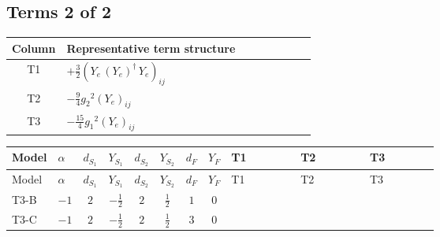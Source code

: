 \documentclass[8pt]{article}
\begin{document}
\begin{landscape}
\subsection*{Terms 2 of 2}
\begin{center}
\begin{tabular}{@{}c >{\raggedright\arraybackslash}p{0.82\linewidth}@{}}
\toprule
Column & Representative term structure \\
\midrule
T1 & \(\displaystyle +\frac{3}{2} \left({Y_e}\,\left({Y_e}\right)^{\dagger}\,{Y_e}\right)_{ij}\) \\
\midrule
T2 & \(\displaystyle -\frac{9}{4} {g_2}^2 \left({Y_e}\right)_{ij}\) \\
\midrule
T3 & \(\displaystyle -\frac{15}{4} {g_1}^2 \left({Y_e}\right)_{ij}\) \\
\midrule
\bottomrule
\end{tabular}
\end{center}
\smallskip
\tiny
\begin{longtable}{@{}llcccccc >{\raggedright\arraybackslash}p{0.21\linewidth} >{\raggedright\arraybackslash}p{0.21\linewidth} >{\raggedright\arraybackslash}p{0.21\linewidth}@{}}
\toprule
Model & $\alpha$ & $d_{S_1}$ & $Y_{S_1}$ & $d_{S_2}$ & $Y_{S_2}$ & $d_F$ & $Y_F$ & T1 & T2 & T3 \\
\midrule
\endfirsthead
\toprule
Model & $\alpha$ & $d_{S_1}$ & $Y_{S_1}$ & $d_{S_2}$ & $Y_{S_2}$ & $d_F$ & $Y_F$ & T1 & T2 & T3 \\
\midrule
\endhead
T3-B & $-1$ & $2$ & $-\frac{1}{2}$ & $2$ & $\frac{1}{2}$ & $1$ & $0$ & \scriptsize\adjustbox{max width=\linewidth}{$\begin{gathered} +\frac{3}{2} \left({Y_e}\,\left({Y_e}\right)^{\dagger}\,{Y_e}\right)_{ij}\end{gathered}$} & \scriptsize\adjustbox{max width=\linewidth}{$\begin{gathered} -\frac{9}{4} {g_2}^2 \left({Y_e}\right)_{ij}\end{gathered}$} & \scriptsize\adjustbox{max width=\linewidth}{$\begin{gathered} -\frac{15}{4} {g_1}^2 \left({Y_e}\right)_{ij}\end{gathered}$} \\
\midrule
T3-C & $-1$ & $2$ & $-\frac{1}{2}$ & $2$ & $\frac{1}{2}$ & $3$ & $0$ & \scriptsize\adjustbox{max width=\linewidth}{$\begin{gathered} +\frac{3}{2} \left({Y_e}\,\left({Y_e}\right)^{\dagger}\,{Y_e}\right)_{ij}\end{gathered}$} & \scriptsize\adjustbox{max width=\linewidth}{$\begin{gathered} -\frac{9}{4} {g_2}^2 \left({Y_e}\right)_{ij}\end{gathered}$} & \scriptsize\adjustbox{max width=\linewidth}{$\begin{gathered} -\frac{15}{4} {g_1}^2 \left({Y_e}\right)_{ij}\end{gathered}$} \\

\end{longtable}
\end{landscape}
\end{document}

